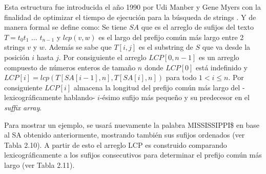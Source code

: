 Esta estructura fue introducida el año 1990 por Udi Manber y Gene Myers con la finalidad de optimizar el tiempo de ejecución para la búsqueda de strings \cite{suffixarray1}. Y de manera formal se define como: Se tiene $SA$ que es el arreglo de sufijos del texto $T=t_{0}t_{1}$ $\ldots$ $t_{n-1}$ y $lcp(v,w)$ es el largo del prefijo común más largo entre 2 strings $v$ y $w$. Además se sabe que $T[i,j]$ es el substring de $S$ que va desde la posición $i$ hasta $j$. Por consiguiente el arreglo $LCP[0,n-1]$ es un arreglo compuesto de números enteros de tamaño $n$ donde $LCP[0]$ está indefinido y $LCP[i] = lcp(T[SA[i-1],n], T[SA[i],n])$ para todo $1 < i \leq n$. Por consiguiente $LCP[i]$ almacena la longitud del prefijo común más largo del -lexicográficamente hablando-  $i$-ésimo sufijo más pequeño y su predecesor en el \textit{suffix array}.

Para mostrar un ejemplo, se usará nuevamente la palabra MISSISSIPPI\$ en base al SA obtenido anteriormente, mostrando también sus sufijos ordenados (ver Tabla 2.10). A partir de esto el arreglo LCP es construido comparando lexicográficamente a los sufijos consecutivos para determinar el prefijo común más largo (ver Tabla 2.11).

